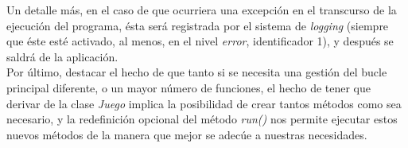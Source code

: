 Un detalle más, en el caso de que ocurriera una excepción en el transcurso de la ejecución del programa, ésta será registrada por el sistema de \emph{logging} (siempre que éste esté activado, al menos, en el nivel \emph{error}, identificador 1), y después se saldrá de la aplicación.\\

Por último, destacar el hecho de que tanto si se necesita una gestión del bucle principal diferente, o un mayor número de funciones, el hecho de tener que derivar de la clase \emph{Juego} implica la posibilidad de crear tantos métodos como sea necesario, y la redefinición opcional del método \emph{run()} nos permite ejecutar estos nuevos métodos de la manera que mejor se adecúe a nuestras necesidades.

